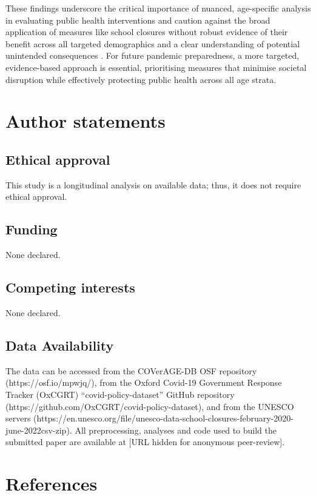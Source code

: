 \documentclass[
  number]{elsarticle}
\begin{document}
These findings underscore the critical importance of nuanced,
age-specific analysis in evaluating public health interventions and
caution against the broad application of measures like school closures
without robust evidence of their benefit across all targeted
demographics and a clear understanding of potential unintended
consequences \citep{alfano2020efficacy, molefi2021impact}. For future
pandemic preparedness, a more targeted, evidence-based approach is
essential, prioritising measures that minimise societal disruption while
effectively protecting public health across all age strata.

\section{Author statements}\label{author-statements}

\subsection{Ethical approval}\label{ethical-approval}

This study is a longitudinal analysis on available data; thus, it does
not require ethical approval.

\subsection{Funding}\label{funding}

None declared.

\subsection{Competing interests}\label{competing-interests}

None declared.

\subsection{Data Availability}\label{data-availability}

The data can be accessed from the COVerAGE-DB OSF repository
(https://osf.io/mpwjq/), from the Oxford Covid-19 Government Response
Tracker (OxCGRT) ``covid-policy-dataset'' GitHub repository
(https://github.com/OxCGRT/covid-policy-dataset), and from the UNESCO
servers
(https://en.unesco.org/file/unesco-data-school-closures-february-2020-june-2022csv-zip).
All preprocessing, analyses and code used to build the submitted paper
are available at {[}URL hidden for anonymous peer-review{]}.

\section{References}\label{references}

\renewcommand{\bibsection}{}

\end{document}
